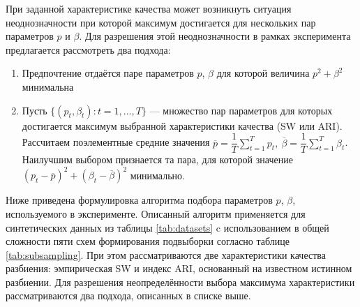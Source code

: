 \documentclass[12pt]{a&t}
\begin{document}
При заданной характеристике качества может возникнуть ситуация неоднозначности при которой максимум достигается для нескольких пар параметров  $ p $ и $ \beta $. Для разрешения этой неоднозначности в рамках эксперимента предлагается рассмотреть два подхода:
\begin{enumerate}
	\item
	Предпочтение отдаётся паре параметров $ p $, $ \beta $ для которой величина $ p^2+\beta^2 $ минимальна
	\item
	Пусть $ \{(p_t, \beta_t): t=1,\ldots,T\} $ --- множество пар параметров для которых достигается максимум выбранной характеристики качества (SW или ARI). Рассчитаем поэлементные средние значения $ \overline{p} = \dfrac{1}{T}\sum_{t=1}^{T}p_t,\:\overline{\beta} = \dfrac{1}{T}\sum_{t=1}^{T}\beta_t $. Наилучшим выбором признается та пара, для которой значение $ (p_t-\overline{p})^2 + (\beta_t-\overline{\beta})^2 $ минимально.
\end{enumerate}

Ниже приведена формулировка алгоритма подбора параметров $ p $, $ \beta $, используемого в эксперименте. Описанный алгоритм применяется для синтетических данных из таблицы \ref{tab:datasets} c использованием в общей сложности пяти схем формирования подвыборки согласно таблице \ref{tab:subsampling}. При этом рассматриваются две характеристики качества разбиения: эмпирическая SW и индекс ARI, основанный на известном истинном разбиении. Для разрешения неопределённости выбора максимума характеристики рассматриваются два подхода, описанных в списке выше.
\end{document}

